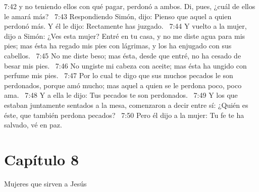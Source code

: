 7:42 y no teniendo ellos con qué pagar, perdonó a ambos. Di, pues, ¿cuál de ellos le amará más?  
7:43 Respondiendo Simón, dijo: Pienso que aquel a quien perdonó más. Y él le dijo: Rectamente has juzgado.  
7:44 Y vuelto a la mujer, dijo a Simón: ¿Ves esta mujer? Entré en tu casa, y no me diste agua para mis pies; mas ésta ha regado mis pies con lágrimas, y los ha enjugado con sus cabellos.  
7:45 No me diste beso; mas ésta, desde que entré, no ha cesado de besar mis pies.  
7:46 No ungiste mi cabeza con aceite; mas ésta ha ungido con perfume mis pies.  
7:47 Por lo cual te digo que sus muchos pecados le son perdonados, porque amó mucho; mas aquel a quien se le perdona poco, poco ama.  
7:48 Y a ella le dijo: Tus pecados te son perdonados.  
7:49 Y los que estaban juntamente sentados a la mesa, comenzaron a decir entre sí: ¿Quién es éste, que también perdona pecados?  
7:50 Pero él dijo a la mujer: Tu fe te ha salvado, vé en paz.  
\section*{Capítulo 8}
Mujeres que sirven a Jesús  

